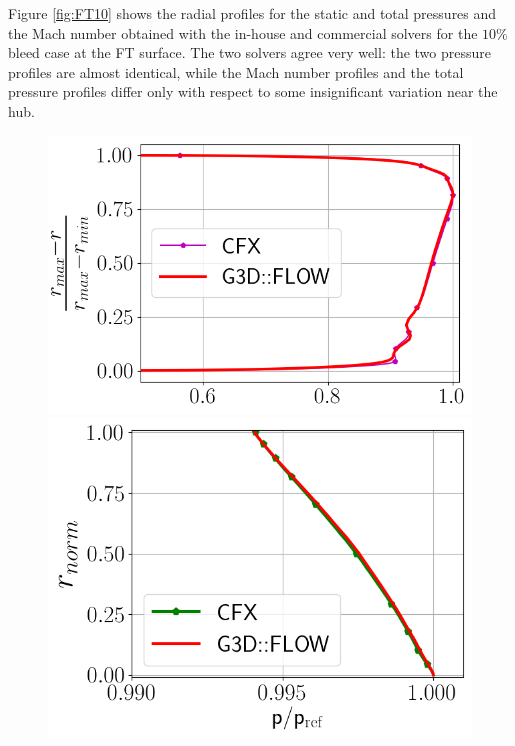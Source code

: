 Figure \ref{fig:FT10} shows the radial profiles for the static and total pressures and the Mach number obtained with the in-house and commercial solvers for the $10\%$ bleed case at the FT surface. The two solvers agree very well: the two pressure profiles are almost identical, while the Mach number profiles and the total pressure profiles differ only with respect to some insignificant variation near the hub.
\begin{figure}[h!]
  \centering
  \begin{minipage}{0.48\columnwidth}
  \includegraphics[width=1.\textwidth]{Figures/MaMave_FT.png}
  \end{minipage}
  \begin{minipage}{0.48\columnwidth}
  \includegraphics[width=1.\textwidth]{Figures/PAave_FT.png}

\end{minipage}
\end{figure}
